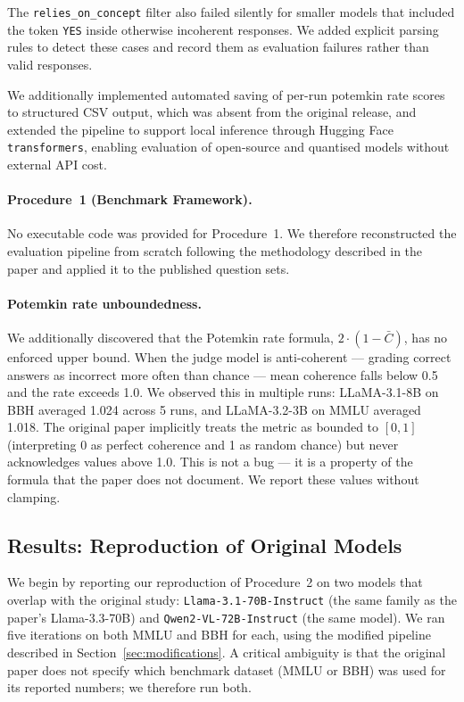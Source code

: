 \documentclass[sigconf,authordraft]{acmart}
\begin{document}
The \texttt{relies\_on\_concept} filter also failed silently for smaller models that included the token \texttt{YES} inside otherwise incoherent responses. We added explicit parsing rules to detect these cases and record them as evaluation failures rather than valid responses.

We additionally implemented automated saving of per-run potemkin rate scores to structured CSV output, which was absent from the original release, and extended the pipeline to support local inference through Hugging Face \texttt{transformers}, enabling evaluation of open-source and quantised models without external API cost.

\paragraph{Procedure~1 (Benchmark Framework).}
No executable code was provided for Procedure~1. We therefore reconstructed the evaluation pipeline from scratch following the methodology described in the paper and applied it to the published question sets.

\paragraph{Potemkin rate unboundedness.}
We additionally discovered that the Potemkin rate formula, $2 \cdot (1 - \bar{C})$, has no enforced upper bound. When the judge model is anti-coherent --- grading correct answers as incorrect more often than chance --- mean coherence falls below 0.5 and the rate exceeds 1.0. We observed this in multiple runs: LLaMA-3.1-8B on BBH averaged 1.024 across 5 runs, and LLaMA-3.2-3B on MMLU averaged 1.018. The original paper implicitly treats the metric as bounded to $[0, 1]$ (interpreting 0 as perfect coherence and 1 as random chance) but never acknowledges values above 1.0. This is not a bug --- it is a property of the formula that the paper does not document. We report these values without clamping.

\subsection{Results: Reproduction of Original Models}
\label{sec:original-repro}

We begin by reporting our reproduction of Procedure~2 on two models that overlap with the original study: \texttt{Llama-3.1-70B-Instruct} (the same family as the paper's Llama-3.3-70B) and \texttt{Qwen2-VL-72B-Instruct} (the same model). We ran five iterations on both MMLU and BBH for each, using the modified pipeline described in Section~\ref{sec:modifications}. A critical ambiguity is that the original paper does not specify which benchmark dataset (MMLU or BBH) was used for its reported numbers; we therefore run both.
\end{document}
